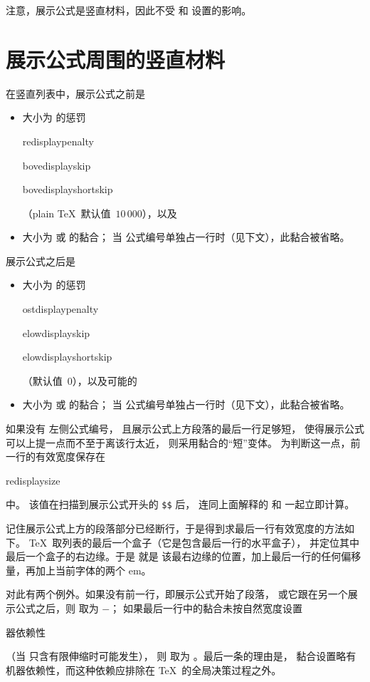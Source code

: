 \documentclass[a4paper]{rapport3}
\makeatletter
\def\term#1\par{\index{#1}}
\def\cstoidx#1\par{\index{#1@\cs{#1}}}
\def\csidx#1{\cstoidx #1\par\cs{#1}}
\makeatother
\begin{document}
注意，展示公式是竖直材料，因此不受  和  设置的影响。

\section{展示公式周围的竖直材料}

在竖直列表中，展示公式之前是
\begin{itemize}\item 大小为  的惩罚
   \cstoidx predisplaypenalty\par\cstoidx abovedisplayskip\par
   \cstoidx abovedisplayshortskip\par
（plain \TeX\ 默认值~$10\,000$），以及
\item 大小为  或  的黏合；
当  公式编号单独占一行时（见下文），此黏合被省略。\end{itemize}
展示公式之后是
\begin{itemize}\item 大小为  的惩罚
   \cstoidx postdisplaypenalty\par\cstoidx belowdisplayskip\par
   \cstoidx belowdisplayshortskip\par
（默认值~0），以及可能的
\item 大小为  或  的黏合；
当  公式编号单独占一行时（见下文），此黏合被省略。\end{itemize}

如果没有  左侧公式编号，
且展示公式上方段落的最后一行足够短，
使得展示公式可以上提一点而不至于离该行太近，
则采用黏合的“短”变体。
为判断这一点，前一行的有效宽度保存在 \csidx{predisplaysize} 中。
该值在扫描到展示公式开头的 \verb>$$> 后，
连同上面解释的  和  一起立即计算。

记住展示公式上方的段落部分已经断行，于是得到求最后一行有效宽度的方法如下。
\TeX\ 取列表的最后一个盒子（它是包含最后一行的水平盒子），
并定位其中最后一个盒子的右边缘。于是  就是
该最右边缘的位置，加上最后一行的任何偏移量，再加上当前字体的两个 em。

对此有两个例外。如果没有前一行，即展示公式开始了段落，
或它跟在另一个展示公式之后，则  取为 $-$；
如果最后一行中的黏合未按自然宽度设置
\term 机器依赖性\par
（当  只含有限伸缩时可能发生），
则  取为 。最后一条的理由是，
黏合设置略有\mdqon 机器依赖性，而这种依赖应排除在 \TeX\ 的全局决策过程之外。\mdqoff
\end{document}
